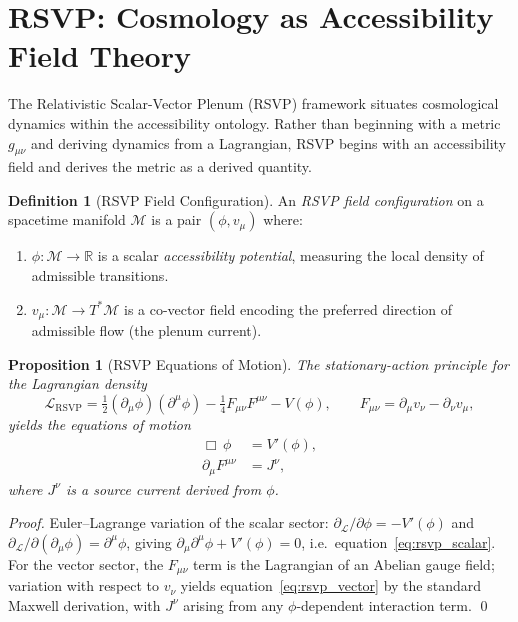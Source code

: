 \documentclass[12pt, a4paper, twoside]{article}
\theoremstyle{plain}
\newtheorem{proposition}[theorem]{Proposition}
\theoremstyle{definition}
\newtheorem{definition}[theorem]{Definition}
\theoremstyle{remark}
\begin{document}
\section{RSVP: Cosmology as Accessibility Field Theory}
\label{sec:rsvp}

The Relativistic Scalar-Vector Plenum (RSVP) framework situates cosmological
dynamics within the accessibility ontology. Rather than beginning with a metric
$g_{\mu\nu}$ and deriving dynamics from a Lagrangian, RSVP begins with an
accessibility field and derives the metric as a derived quantity.

\begin{definition}[RSVP Field Configuration]
An \emph{RSVP field configuration} on a spacetime manifold $\mathcal{M}$ is
a pair $(\phi, v_\mu)$ where:
\begin{enumerate}[label=(\roman*)]
  \item $\phi: \mathcal{M} \to \mathbb{R}$ is a scalar \emph{accessibility
    potential}, measuring the local density of admissible transitions.
  \item $v_\mu: \mathcal{M} \to T^*\mathcal{M}$ is a co-vector field encoding
    the preferred direction of admissible flow (the plenum current).
\end{enumerate}
\end{definition}

\begin{proposition}[RSVP Equations of Motion]
\label{prop:rsvp_eom}
The stationary-action principle for the Lagrangian density
\[
  \mathcal{L}_{\mathrm{RSVP}} = \tfrac{1}{2}(\partial_\mu \phi)(\partial^\mu \phi)
  - \tfrac{1}{4} F_{\mu\nu} F^{\mu\nu} - V(\phi),
  \qquad F_{\mu\nu} = \partial_\mu v_\nu - \partial_\nu v_\mu,
\]
yields the equations of motion
\begin{align}
  \Box\, \phi &= V'(\phi), \label{eq:rsvp_scalar} \\
  \partial_\mu F^{\mu\nu} &= J^\nu, \label{eq:rsvp_vector}
\end{align}
where $J^\nu$ is a source current derived from $\phi$.
\end{proposition}

\begin{proof}
Euler--Lagrange variation of the scalar sector:
$\partial_\mathcal{L}/\partial\phi = -V'(\phi)$ and
$\partial_\mathcal{L}/\partial(\partial_\mu\phi) = \partial^\mu\phi$,
giving $\partial_\mu\partial^\mu\phi + V'(\phi) = 0$, i.e.\
equation~\eqref{eq:rsvp_scalar}.
For the vector sector, the $F_{\mu\nu}$ term is the Lagrangian of an Abelian
gauge field; variation with respect to $v_\nu$ yields
equation~\eqref{eq:rsvp_vector} by the standard Maxwell derivation, with
$J^\nu$ arising from any $\phi$-dependent interaction term.
\qed
\end{proof}
\end{document}
